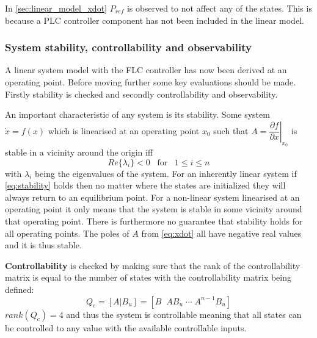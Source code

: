 In \cref{sec:linear_model_xdot} $ P_{ref} $ is observed to not affect any of the states. This is because a PLC controller component has not been included in the linear model.

\subsubsection{System stability, controllability and observability}
A linear system model with the FLC controller has now been derived at an operating point. Before moving further some key evaluations should be made. Firstly stability is checked and secondly controllability and observability.

\medskip
An important characteristic of any system is its stability. Some system $ \dot x = f(x) $ which is linearised at an operating point $ x_0 $ such that $ A = \left. \dfrac{\partial f}{\partial x} \right| _{x_0} $ is stable in a vicinity around the origin iff
\begin{equation}\label{eq:stability}
	Re\{\lambda_i\} < 0 \;\;\; \text{for} \;\;\; 1 \leq i \leq n
\end{equation}
with $ \lambda_i $ being the eigenvalues of the system. For an inherently linear system if \cref{eq:stability} holds then no matter where the states are initialized they will always return to an equilibrium point. For a non-linear system linearised at an operating point it only means that the system is stable in some vicinity around that operating point. There is furthermore no guarantee that stability holds for all operating points. The poles of $ A $ from \cref{eq:xdot} all have negative real values and it is thus stable.

\smallskip
\textbf{Controllability} is checked by making sure that the rank of the controllability matrix is equal to the number of states with the controllability matrix being defined:
\begin{equation}\label{eq:controllability}
	Q_c = [A|B_u] = [B \;\; AB_u \; \cdots \; A^{n-1}B_u]
\end{equation}
$ rank(Q_c) = 4 $ and thus the system is controllable meaning that all states can be controlled to any value with the available controllable inputs.

